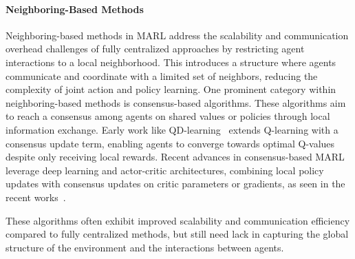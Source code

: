 \documentclass[sigconf]{acmart}
\begin{document}
\paragraph{Neighboring-Based Methods}
Neighboring-based methods in MARL address the scalability and communication overhead challenges of fully centralized approaches by restricting agent interactions to a local neighborhood. 
This introduces a structure where agents communicate and coordinate with a limited set of neighbors, reducing the complexity of joint action and policy learning.
%
One prominent category within neighboring-based methods is consensus-based algorithms. 
These algorithms aim to reach a consensus among agents on shared values or policies through local information exchange. 
Early work like QD-learning~\cite{kar2012qd} extends Q-learning with a consensus update term, 
enabling agents to converge towards optimal Q-values despite only receiving local rewards.
%  
Recent advances in consensus-based MARL leverage deep learning and actor-critic architectures, 
combining local policy updates with consensus updates on critic parameters or gradients, 
as seen in the recent works~\cite{7434032,pennesi2010distributed,zhang2018fully,DBLP:journals/jmlr/CiosekW20}.

These algorithms often exhibit improved scalability and communication efficiency compared to fully centralized methods, 
but still need lack in capturing the global structure of the environment and the interactions between agents.
\end{document}
